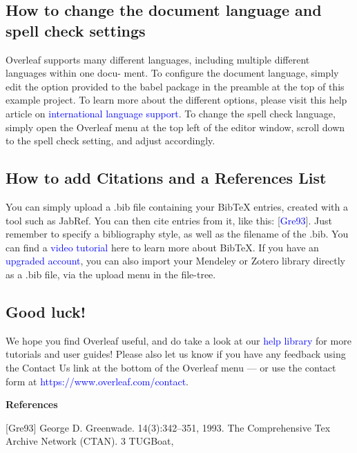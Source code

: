 \documentclass{article}
\begin{document}
	\subsection{How to change the document language and spell check settings}
	
	Overleaf supports many different languages, including multiple different languages within one docu-
	ment.
	To configure the document language, simply edit the option provided to the babel package in the
	preamble at the top of this example project. To learn more about the different options, please visit
	this help article on \textcolor{blue}{international language support}.
	To change the spell check language, simply open the Overleaf menu at the top left of the editor
	window, scroll down to the spell check setting, and adjust accordingly.
	
	\subsection{How to add Citations and a References List}
     You can simply upload a .bib file containing your BibTeX entries, created with a tool such as JabRef.
     You can then cite entries from it, like this: [\textcolor{blue}{Gre93}]. Just remember to specify a bibliography style, as
     well as the filename of the .bib. You can find a \textcolor{blue}{video tutorial} here to learn more about BibTeX.
     If you have an \textcolor{blue}{upgraded account}, you can also import your Mendeley or Zotero library directly as
     a .bib file, via the upload menu in the file-tree.
     
     \subsection{Good luck!}
      
      We hope you find Overleaf useful, and do take a look at our \textcolor{blue}{help library} for more tutorials and user
      guides! Please also let us know if you have any feedback using the Contact Us link at the bottom of
      the Overleaf menu — or use the contact form at \textcolor{blue}{https://www.overleaf.com/contact}.
      \vspace{3mm}
	
	\huge \textbf{References}
	\vspace{4mm}
	
	
   	\small[Gre93] George D. Greenwade.
	14(3):342–351, 1993.
	The Comprehensive Tex Archive Network (CTAN).
	3
	TUGBoat,
	
\end{document}
